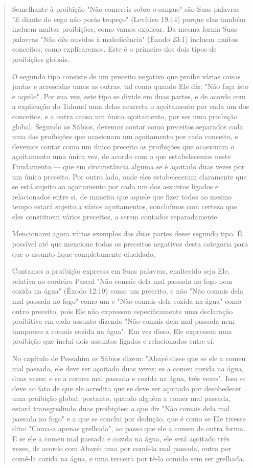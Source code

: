 \begin{quote}Semelhante à proibição "Não comereis sobre o sangue" são Suas pa­lavras
"E diante do cego não porás tropeço" (Levítico 19:14) porque elas
tam­bém incluem muitas proibições, como vamos explicar. Da mesma forma
Suas palavras "Não dês ouvidos à maledicência" (Êxodo 23:1) incluem
muitos con­ceitos, como explicaremos. Este é o primeiro dos dois tipos
de proibições globais.

O segundo tipo consiste de um preceito negativo que proíbe várias coisas
juntas e acrescidas umas as outras, tal como quando Ele diz: "Não faça
isto e aquilo". Por sua vez, este tipo se divide em duas partes, e de
acordo com a explicação do Talmud uma delas acarreta o açoitamento por
cada um dos con­ceitos, e a outra causa um único açoitamento, por ser
uma proibição global. Segundo os Sábios, devemos contar como preceitos
separados cada uma das proibições que ocasionam um açoitamento por cada
conceito, e devemos con­tar como um único preceito as proibições que
ocasionam o açoitamento uma única vez, de acordo com o que estabelecemos
neste Fundamento --- que em circunstância alguma se é açoitado duas
vezes por um único preceito. Por ou­tro lado, onde eles estabeleceram
claramente que se está sujeito ao açoitamen­to por cada um dos assuntos
ligados e relacionados entre si, de maneira que aquele que fizer todos
ao mesmo tempo estará sujeito a vários açoitamentos, concluímos com
certeza que eles constituem vários preceitos, a serem conta­dos
separadamente.

Mencionarei agora vários exemplos das duas partes desse segundo tipo. É
possível até que mencione todos os preceitos negativos desta categoria
para que o assunto fique completamente elucidado.

Contamos a proibição expressa em Suas palavras, enaltecido seja Ele,
relativa ao cordeiro Pascal "Não comais dela mal passada no fogo nem
cozida na água" (Êxodo 12:19) como um preceito, e não "Não comais dela
mal passa­da no fogo" como um e "Não comais dela cozida na água" como
outro precei­to, pois Ele não expressou especificamente uma declaração
proibitiva em cada assunto dizendo "Não comais dela mal passada nem
tampouco a comais cozida na água". Em vez disso, Ele expressou uma
proibição que inclui dois assuntos ligados e relacionados entre si.

No capítulo de Pessahim os Sábios dizem: "Abayé disse que se ele a comeu
mal passada, ele deve ser açoitado duas vezes; se a comeu cozida na
água, duas vezes; e se a comeu mal passada e cozida na água, três
vezes". Isso se deve ao fato de que ele acredita que se deve ser
açoitado por desobedecer uma proibição global; portanto, quando alguém a
comer mal passada, estará transgredindo duas proibições: a que diz "Não
comais dela mal passada no fo­go" e a que se conclui por dedução, que é
como se Ele tivesse dito: "Coma-a apenas grelhada", ao passo que ele a
comeu de outra forma. E se ele a comeu mal passada e cozida na água, ele
será açoitado três vezes, de acordo com Aba­yé: uma por comê-la mal
passada, outra por comê-la cozida na água, e uma ter­ceira por tê-la
comido sem ser grelhada.


\end{quote}
